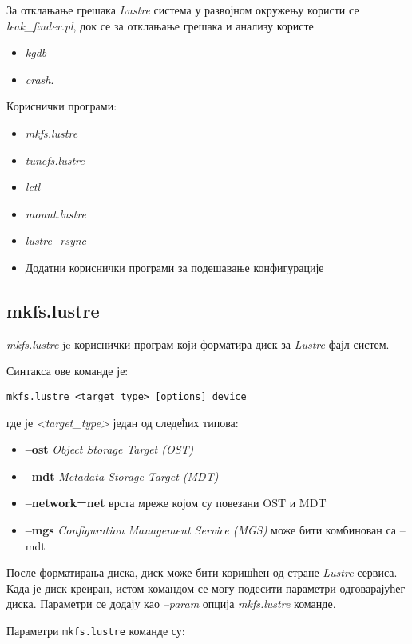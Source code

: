 За отклањање грешака   \textit{Lustre}  система у развојном окружењу користи се \textit{leak\_finder.pl}, док се за отклањање грешака и анализу користе
\begin{itemize}
\item \textit{kgdb}
\item \textit{crash}.
\end{itemize}

Кориснички програми:
\begin{itemize}
\item \textit{mkfs.lustre}
\item \textit{tunefs.lustre}
\item \textit{lctl}
\item \textit{mount.lustre}
\item \textit{lustre\_rsync}
\item Додатни кориснички програми за подешавање конфигурације
\end{itemize}

\subsection{mkfs.lustre}
\textit{mkfs.lustre} je кориснички програм који форматира диск за   \textit{Lustre} фајл систем.

Синтакса ове команде је:
\begin{verbatim}
mkfs.lustre <target_type> [options] device
\end{verbatim}
где је \textit{<target\_type>} један од следећих типова:

\begin{itemize}
\item \textbf{--ost}
\textit{Object Storage Target (OST)}
\item \textbf{--mdt}
\textit{ Metadata Storage Target (MDT)}
\item \textbf{--network=net }
врста мреже којом су повезани OST и MDT
\item \textbf{--mgs }
\textit{ Configuration Management Service (MGS)} може бити комбинован са  --mdt
\end{itemize}
После форматирања диска, диск може бити коришћен од стране   \textit{Lustre} сервиса.
Када је диск креиран, истом командом се  могу подесити параметри  одговарајућег диска.
Параметри се додају као \textit{--param} опција \textit{mkfs.lustre} команде.

Параметри \texttt{mkfs.lustre} команде су:

